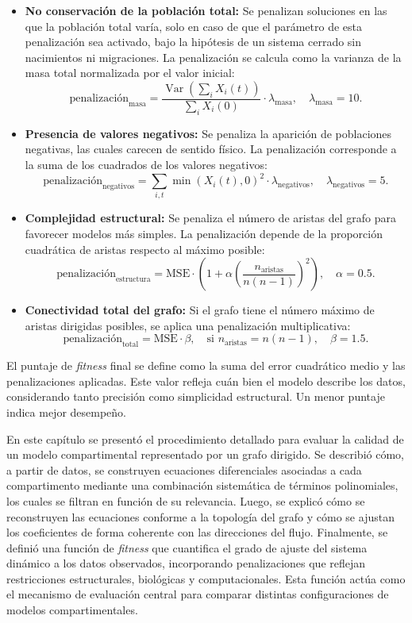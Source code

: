 \begin{itemize}
    \item \textbf{No conservación de la población total:} Se penalizan soluciones en las que la población total varía, solo en caso de que el par\'ametro de 
    esta penalizaci\'on sea activado, bajo la hipótesis de un sistema cerrado sin nacimientos ni migraciones. La penalización se calcula como la varianza de la 
    masa total normalizada por el valor inicial:
    \[
    \text{penalización}_\text{masa} = \frac{\operatorname{Var}\left( \sum_i X_i(t) \right)}{\sum_i X_i(0)} \cdot \lambda_{\text{masa}}, \quad \lambda_{\text{masa}} = 10.
    \]

    \item \textbf{Presencia de valores negativos:} Se penaliza la aparición de poblaciones negativas, las cuales carecen de sentido físico. La penalización corresponde a la suma de los cuadrados de los valores negativos:
    \[
    \text{penalización}_\text{negativos} = \sum_{i,t} \min\left(X_i(t), 0\right)^2 \cdot \lambda_{\text{negativos}}, \quad \lambda_{\text{negativos}} = 5.
    \]

    \item \textbf{Complejidad estructural:} Se penaliza el número de aristas del grafo para favorecer modelos más simples. La penalización depende de la proporción cuadrática de aristas respecto al máximo posible:
    \[
    \text{penalización}_\text{estructura} = \text{MSE} \cdot \left(1 + \alpha \left( \frac{n_\text{aristas}}{n(n-1)} \right)^2 \right), \quad \alpha = 0.5.
    \]

    \item \textbf{Conectividad total del grafo:} Si el grafo tiene el número máximo de aristas dirigidas posibles, se aplica una penalización multiplicativa:
    \[
    \text{penalización}_\text{total} = \text{MSE} \cdot \beta, \quad \text{si } n_\text{aristas} = n(n-1), \quad \beta = 1.5.
    \]
\end{itemize}

El puntaje de \textit{fitness} final se define como la suma del error cuadrático medio y las penalizaciones aplicadas. Este valor refleja cuán bien el modelo describe 
los datos, considerando tanto precisión como simplicidad estructural. Un menor puntaje indica mejor desempeño.

En este capítulo se presentó el procedimiento detallado para evaluar la calidad de un modelo compartimental representado por un grafo dirigido. Se describió cómo, a 
partir de datos, se construyen ecuaciones diferenciales asociadas a cada compartimento mediante una combinación sistemática de términos polinomiales, 
los cuales se filtran en función de su relevancia. Luego, se explicó cómo se reconstruyen las ecuaciones conforme a la topología del grafo y 
cómo se ajustan los coeficientes de forma coherente con las direcciones del flujo. Finalmente, se definió una función de \textit{fitness} que cuantifica el grado de 
ajuste del sistema dinámico a los datos observados, incorporando penalizaciones que reflejan restricciones estructurales, biológicas y computacionales. Esta función 
actúa como el mecanismo de evaluación central para comparar distintas configuraciones de modelos compartimentales.

